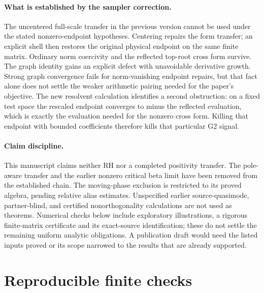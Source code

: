 \documentclass[11pt]{article}
\theoremstyle{remark}
\begin{document}
\paragraph{What is established by the sampler correction.}
The uncentered full-scale transfer in the previous version cannot be used
under the stated nonzero-endpoint hypotheses. Centering repairs the form
transfer; an explicit shell then restores the original physical endpoint
on the same finite matrix. Ordinary norm coercivity and the reflected
top-root cross form survive. The graph identity gains an explicit defect
with unavoidable derivative growth. Strong graph convergence fails for
norm-vanishing endpoint repairs, but that fact alone does not settle the
weaker arithmetic pairing needed for the paper's objective. The new
resolvent calculation identifies a second obstruction: on a fixed test
space the rescaled endpoint converges to minus the reflected evaluation,
which is exactly the evaluation needed for the nonzero cross form.
Killing that endpoint with bounded coefficients therefore kills that
particular G2 signal.

\paragraph{Claim discipline.}
This manuscript claims neither RH nor a completed positivity transfer.
The pole-aware transfer and the earlier nonzero critical beta limit have
been removed from the established chain. The moving-phase exclusion is
restricted to its proved algebra, pending relative alias estimates.
Unspecified earlier source-quasimode, partner-blind, and certified
nonorthogonality calculations are not used as theorems. Numerical checks
below include exploratory illustrations, a rigorous finite-matrix
certificate and its exact-source identification; these do not settle
the remaining uniform analytic obligations. A publication draft would need the listed inputs
proved or its scope narrowed to the results that are already supported.

\appendix
\section{Reproducible finite checks}\label{app:numerics}
\end{document}
